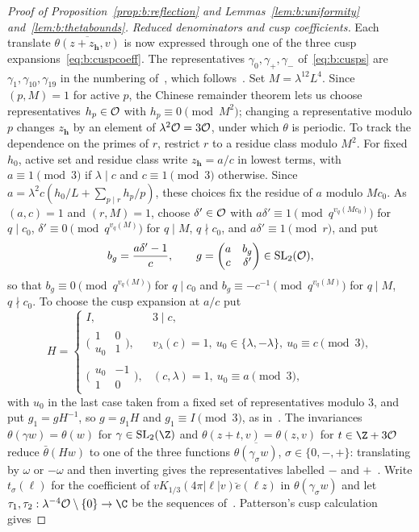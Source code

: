 \begin{proof}[Proof of Proposition~\ref{prop:b:reflection} and Lemmas~\ref{lem:b:uniformity} and~\ref{lem:b:thetabounds}]
\emph{Reduced denominators and cusp coefficients.} Each translate $\overline{\theta(z+z_{\boldsymbol h},v)}$ is now expressed through one of the three cusp expansions~\eqref{eq:b:cuspcoeff}. The representatives $\gamma_0,\gamma_+,\gamma_-$ of~\eqref{eq:b:cusps} are $\gamma_1,\gamma_{10},\gamma_{19}$ in the numbering of~\cite[\S5.1]{DR}, which follows~\cite[Table~II]{Pat77}. Set $M=\lambda^{12}L^4$. Since $(p,M)=1$ for active $p$, the Chinese remainder theorem lets us choose representatives $h_p\in\mathcal{O}$ with $h_p\equiv0\pmod{M^2}$; changing a representative modulo $p$ changes $z_{\boldsymbol h}$ by an element of $\lambda^2\mathcal{O}=3\mathcal{O}$, under which $\theta$ is periodic. To track the dependence on the primes of $r$, restrict $r$ to a residue class modulo $M^2$. For fixed $h_0$, active set and residue class write $z_{\boldsymbol h}=a/c$ in lowest terms, with $a\equiv1\pmod3$ if $\lambda\mid c$ and $c\equiv1\pmod3$ otherwise. Since $a=\lambda^2c(h_0/L+\sum_{p\mid r}h_p/p)$, these choices fix the residue of $a$ modulo $Mc_0$. As $(a,c)=1$ and $(r,M)=1$, choose $\delta'\in\mathcal{O}$ with $a\delta'\equiv1\pmod{q^{v_q(Mc_0)}}$ for $q\mid c_0$, $\delta'\equiv0\pmod{q^{v_q(M)}}$ for $q\mid M$, $q\nmid c_0$, and $a\delta'\equiv1\pmod r$, and put
\[
  b_g=\frac{a\delta'-1}c,\qquad g=\begin{pmatrix}a&b_g\\c&\delta'\end{pmatrix}\in\mathrm{SL}_2(\mathcal{O}),
\]
so that $b_g\equiv0\pmod{q^{v_q(M)}}$ for $q\mid c_0$ and $b_g\equiv-c^{-1}\pmod{q^{v_q(M)}}$ for $q\mid M$, $q\nmid c_0$. To choose the cusp expansion at $a/c$ put
\[
  H=\begin{cases}I,&3\mid c,\\\bigl(\begin{smallmatrix}1&0\\u_0&1\end{smallmatrix}\bigr),&v_\lambda(c)=1,\ u_0\in\{\lambda,-\lambda\},\ u_0\equiv c\pmod3,\\\bigl(\begin{smallmatrix}u_0&-1\\1&0\end{smallmatrix}\bigr),&(c,\lambda)=1,\ u_0\equiv a\pmod3,\end{cases}
\]
with $u_0$ in the last case taken from a fixed set of representatives modulo $3$, and put $g_1=gH^{-1}$, so $g=g_1H$ and $g_1\equiv I\pmod3$, as in~\cite[\S5.1]{DR}. The invariances $\theta(\gamma w)=\theta(w)$ for $\gamma\in\mathrm{SL}_2(\Z)$ and $\theta(z+t,v)=\theta(z,v)$ for $t\in\Z+3\OO$ reduce $\bar\theta(Hw)$ to one of the three functions $\overline{\theta(\gamma_\sigma w)}$, $\sigma\in\{0,-,+\}$: translating by $\omega$ or $-\omega$ and then inverting gives the representatives labelled $-$ and $+$~\cite[(5.9)--(5.15), Appendix~A]{DR}. Write $t_\sigma(\ell)$ for the coefficient of $vK_{1/3}(4\pi|\ell|v)\breve e(\ell z)$ in $\theta(\gamma_\sigma w)$ and let $\tau_1,\tau_2:\lambda^{-4}\OO\setminus\{0\}\to\C$ be the sequences of~\cite[(5.13), (5.14)]{DR}. Patterson's cusp calculation~\cite[Theorem~8.1 and Table~III]{Pat77} gives

\end{proof}
